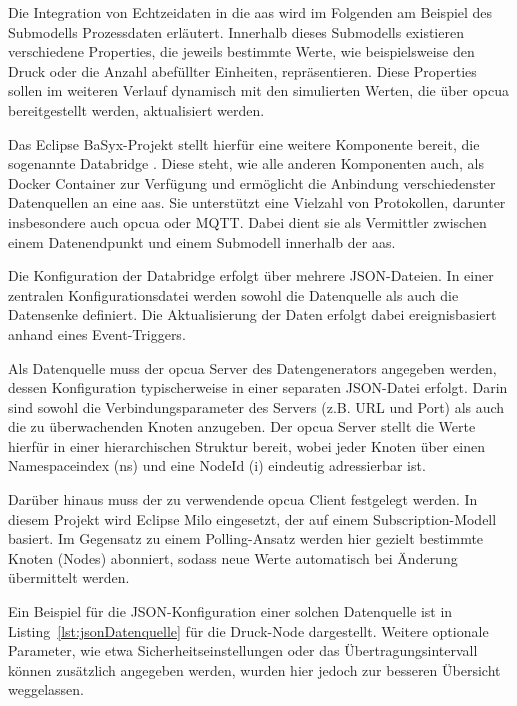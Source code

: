 Die Integration von Echtzeidaten in die \acs{aas} wird im Folgenden am Beispiel des Submodells Prozessdaten erläutert.
Innerhalb dieses Submodells existieren verschiedene Properties, die jeweils bestimmte Werte, wie beispielsweise den Druck oder die Anzahl abefüllter Einheiten, repräsentieren. %
Diese Properties sollen im weiteren Verlauf dynamisch mit den simulierten Werten, die über \acs{opcua} bereitgestellt werden, aktualisiert werden.



Das Eclipse BaSyx-Projekt stellt hierfür eine weitere Komponente bereit, die sogenannte Databridge \cite{BaSyxDatabridge}.
Diese steht, wie alle anderen Komponenten auch, als Docker Container zur Verfügung und ermöglicht die Anbindung verschiedenster Datenquellen an eine \acs{aas}.
Sie unterstützt eine Vielzahl von Protokollen, darunter insbesondere auch \acs{opcua} oder MQTT.
Dabei dient sie als Vermittler zwischen einem Datenendpunkt und einem Submodell innerhalb der \acs{aas}.

Die Konfiguration der Databridge erfolgt über mehrere JSON-Dateien.
In einer zentralen Konfigurationsdatei werden sowohl die Datenquelle als auch die Datensenke definiert.
Die Aktualisierung der Daten erfolgt dabei ereignisbasiert anhand eines Event-Triggers.

Als Datenquelle muss der \acs{opcua} Server des Datengenerators angegeben werden, dessen Konfiguration typischerweise in einer separaten JSON-Datei erfolgt.
Darin sind sowohl die Verbindungsparameter des Servers (z.B. URL und Port) als auch die zu überwachenden Knoten anzugeben.
Der \acs{opcua} Server stellt die Werte hierfür in einer hierarchischen Struktur bereit, wobei jeder Knoten über einen Namespaceindex (ns) und eine NodeId (i) eindeutig adressierbar ist.

Darüber hinaus muss der zu verwendende \acs{opcua} Client festgelegt werden.
In diesem Projekt wird Eclipse Milo eingesetzt, der auf einem Subscription-Modell basiert.
Im Gegensatz zu einem Polling-Ansatz werden hier gezielt bestimmte Knoten (Nodes) abonniert, sodass neue Werte automatisch bei Änderung übermittelt werden.

Ein Beispiel für die JSON-Konfiguration einer solchen Datenquelle ist in Listing~\ref{lst:jsonDatenquelle} für die Druck-Node dargestellt.
Weitere optionale Parameter, wie etwa Sicherheitseinstellungen oder das Übertragungsintervall können zusätzlich angegeben werden, wurden hier jedoch zur besseren Übersicht weggelassen.

